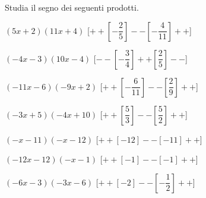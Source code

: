 \begin{esercizio}\label{ese:dis_6}
 Studia il segno dei seguenti prodotti.
 \begin{enumeratea}
  \item  $\left(5 x +2\right)\left(11 x +4\right)$ \hfill 
  [$++\left [-\dfrac{2}{5} \right ]--\left [-\dfrac{4}{11} \right ]++$]
  \item  $\left(-4 x -3\right)\left(10 x -4\right)$ \hfill 
  [$--\left [-\dfrac{3}{4} \right ]++\left [\dfrac{2}{5} \right ]--$]
  \item  $\left(-11 x -6\right)\left(-9 x +2\right)$ \hfill 
  [$++\left [-\dfrac{6}{11} \right ]--\left [\dfrac{2}{9} \right ]++$]
  \item  $\left(-3 x +5\right)\left(-4 x +10\right)$ \hfill 
  [$++\left [\dfrac{5}{3} \right ]--\left [\dfrac{5}{2} \right ]++$]
  \item  $\left(- x -11\right)\left(- x -12\right)$ \hfill 
  [$++\left [-12 \right ]--\left [-11 \right ]++$]
  \item  $\left(-12 x -12\right)\left(- x -1\right)$ \hfill 
  [$++\left [-1 \right ]--\left [-1 \right ]++$]
  \item  $\left(-6 x -3\right)\left(-3 x -6\right)$ \hfill 
  [$++\left [-2 \right ]--\left [-\dfrac{1}{2} \right ]++$]
 \end{enumeratea}
\end{esercizio}


\subsubsection*{}

